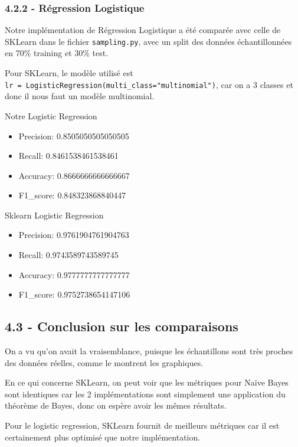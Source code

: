\documentclass[
]{article}
\begin{document}
\subsubsection{4.2.2 - Régression
Logistique}\label{ruxe9gression-logistique-2}

Notre implémentation de Régression Logistique a été comparée avec celle
de SKLearn dans le fichier \texttt{sampling.py}, avec un split des
données échantillonnées en 70\% training et 30\% test.

Pour SKLearn, le modèle utilisé est
\texttt{lr\ =\ LogisticRegression(multi\_class="multinomial")}, car on a
3 classes et donc il nous faut un modèle multinomial.
\cite{sklearnLogReg}

Notre Logistic Regression

\begin{itemize}
\item
  Precision: 0.8505050505050505
\item
  Recall: 0.8461538461538461
\item
  Accuracy: 0.8666666666666667
\item
  F1\_score: 0.848323868840447
\end{itemize}

Sklearn Logistic Regression

\begin{itemize}
\item
  Precision: 0.9761904761904763
\item
  Recall: 0.9743589743589745
\item
  Accuracy: 0.9777777777777777
\item
  F1\_score: 0.9752738654147106
\end{itemize}

\subsection{4.3 - Conclusion sur les
comparaisons}\label{conclusion-sur-les-comparaisons}

On a vu qu'on avait la vraisemblance, puisque les échantillons sont très
proches des données réelles, comme le montrent les graphiques.

En ce qui concerne SKLearn, on peut voir que les métriques pour Naïve
Bayes sont identiques car les 2 implémentations sont simplement une
application du théorème de Bayes, donc on espère avoir les mêmes
résultats.

Pour le logistic regression, SKLearn fournit de meilleurs métriques car
il est certainement plus optimisé que notre implémentation.
\end{document}
